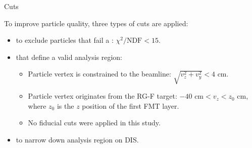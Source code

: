 \begin{frame}{Cuts}
    \label{11.21::summary}

    To improve particle quality, three types of cuts are applied:
    \begin{itemize}
        \item
             to exclude particles that fail a : $\chi^2/\text{NDF} < 15$.

        \item
             that define a valid analysis region:
            \begin{itemize}
                \item
                    Particle vertex is constrained to the beamline: $\sqrt{v_z^2 + v_y^2} < 4 \text{ cm}$.

                \item
                    Particle vertex originates from the RG-F target: $-40 \text{ cm} < v_z < z_0 \text{ cm}$, where $z_0$ is the $z$ position of the first FMT layer.

                \item
                    No fiducial cuts were applied in this study.
            \end{itemize}

        \item
             to narrow down analysis region on DIS.
    \end{itemize}
\end{frame}
